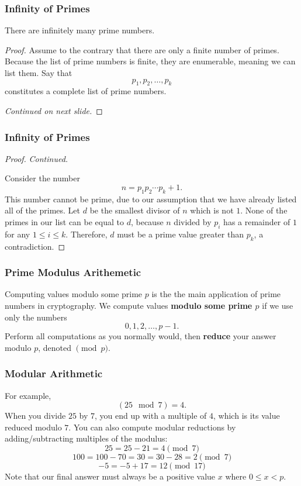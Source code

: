 \documentclass{beamer}
\newcommand{\<}{\langle}
\renewcommand{\>}{\rangle}
\begin{document}
\begin{frame}
\frametitle{Infinity of Primes}

\begin{theorem}[Euclid]
There are infinitely many prime numbers. 
\end{theorem}
\begin{proof}
Assume to the contrary that there are only a finite number of primes. Because the list of prime numbers is finite, they are enumerable, meaning we can list them. Say that 
\[
p_1, p_2, \dots, p_k
\]
constitutes a complete list of prime numbers. \newline

\emph{Continued on next slide.}
\end{proof}
\end{frame}

\begin{frame}
\frametitle{Infinity of Primes}

\begin{proof}
\emph{Continued.}

Consider the number
\[
n = p_1p_2\cdots p_k + 1.
\]
This number cannot be prime, due to our assumption that we have already listed all of the primes. Let $d$ be the smallest divisor of $n$ which is not $1$. None of the primes in our list can be equal to $d$, because $n$ divided by $p_i$ has a remainder of $1$ for any $1\le i \le k$. Therefore, $d$ must be a prime value greater than $p_k$, a contradiction.
\end{proof}
\end{frame}


\begin{frame}
\frametitle{Prime Modulus Arithemetic}

Computing values modulo some prime $p$ is the the main application of prime numbers in cryptography. We compute values \textbf{modulo some prime $p$} if we use  only the numbers
\[
0, 1, 2, \dots, p-1.
\]
Perform all computations as you normally would, then \textbf{reduce} your answer modulo $p$, denoted $\pmod p$.
\end{frame}

\begin{frame}
\frametitle{Modular Arithmetic}

For example,
\[
(25 \mod 7) = 4.
\]
When you divide $25$ by $7$, you end up with a multiple of $4$, which is its value reduced modulo $7$. You can also compute modular reductions by adding/subtracting multiples of the modulus:
\[
25 = 25 - 21 = 4 \pmod 7
\]
\[
100 = 100 - 70 = 30 = 30 - 28 = 2 \pmod 7
\]
\[
-5 = -5 + 17 = 12 \pmod{17}
\]
Note that our final answer must always be a positive value $x$ where $0 \le x < p$.
\end{frame}
\end{document}
